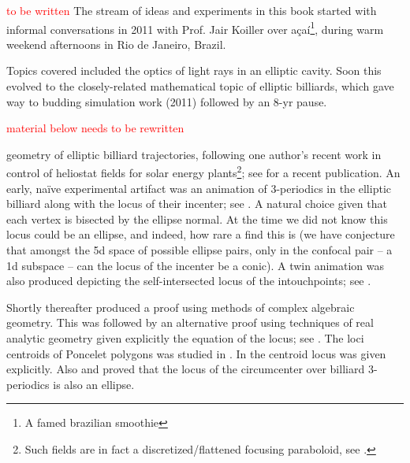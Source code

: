 \textcolor{red}{to be written}
The stream of ideas and experiments in this book started with informal conversations in 2011 with Prof. Jair Koiller over açaí\footnote{A famed brazilian smoothie}, during warm weekend afternoons in Rio de Janeiro, Brazil.

Topics covered included the optics of light rays in an elliptic cavity. Soon this evolved to the closely-related mathematical topic of elliptic billiards, which gave way to budding simulation work (2011) followed by an 8-yr pause.




\textcolor{red}{material below needs to be rewritten}

geometry of elliptic billiard trajectories, following one author's recent work in control of heliostat fields for solar energy plants\footnote{Such fields are in fact a discretized/flattened focusing paraboloid, see \cite{sundrop2016,esolar2017}.}; see \cite{gross2020-solar} for a recent publication. An early, naïve experimental artifact was an animation of 3-periodics in the elliptic billiard along with the locus of their incenter; see  \cite{dsr_vid11incenter}. A natural choice given that each vertex is bisected by the ellipse normal. At the time we did not know this locus could be an ellipse, and indeed, how rare a find this is (we have conjecture that amongst the 5d space of possible ellipse pairs, only in the confocal pair -- a 1d subspace -- can the locus of the incenter be a conic). A twin animation was also produced depicting the self-intersected locus of the intouchpoints; see \cite{dsr_vid11e}.

Shortly thereafter \cite{olga14} produced a proof using methods of complex algebraic geometry.
This was followed by an alternative    proof using techniques of real analytic   geometry given explicitly the equation of the locus; see \cite{garcia2019-incenter}. The loci centroids of Poncelet polygons was studied in \cite{schwartz2016-com}. In  \cite{garcia2019-incenter} the centroid locus was given explicitly.  Also \cite{corentin2021-circum} and \cite{garcia2018} proved that the locus of the circumcenter over billiard 3-periodics is also an ellipse.
